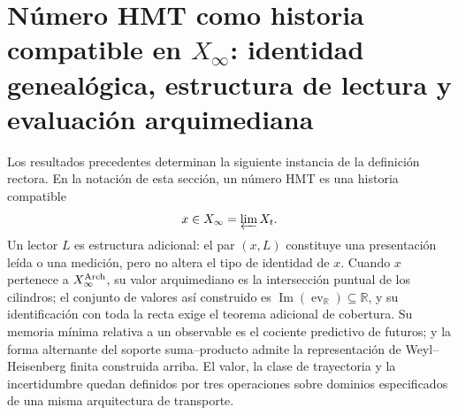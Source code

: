 \section{Número HMT como historia compatible en \(X_\infty\): identidad genealógica, estructura de lectura y evaluación arquimediana}

Los resultados precedentes determinan la siguiente instancia de la definición
rectora. En la notación de esta sección, un número HMT es una historia
compatible
\[
x\in X_\infty=\varprojlim X_t.
\]
Un lector \(L\) es estructura adicional: el par \((x,L)\) constituye una
presentación leída o una medición, pero no altera el tipo de identidad de
\(x\). Cuando \(x\) pertenece a \(X_\infty^{\rm Arch}\), su valor
arquimediano es la intersección puntual de los cilindros; el conjunto de
valores así construido es
\(\operatorname{Im}(\operatorname{ev}_{\mathbb R})\subseteq\mathbb R\), y
su identificación con toda la recta exige el teorema adicional de cobertura.
Su memoria mínima relativa a un observable es el cociente predictivo de
futuros; y la forma alternante del soporte suma--producto admite la
representación de Weyl--Heisenberg finita construida arriba. El valor, la clase de trayectoria y la incertidumbre quedan
definidos por tres operaciones sobre dominios especificados de una misma
arquitectura de transporte.
